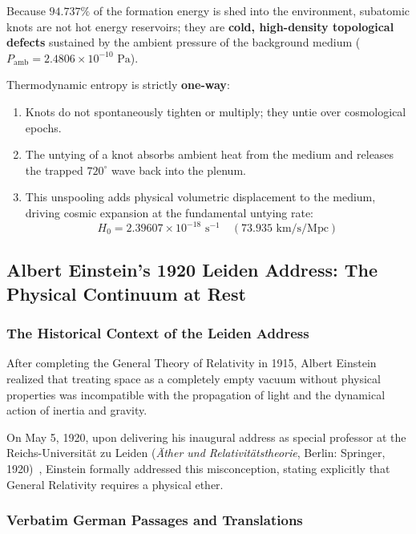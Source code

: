 \documentclass[11pt,a4paper]{article}
\begin{document}
Because $94.737\%$ of the formation energy is shed into the environment, subatomic knots are not hot energy reservoirs; they are \textbf{cold, high-density topological defects} sustained by the ambient pressure of the background medium ($P_{\text{amb}} = 2.4806 \times 10^{-10}\text{ Pa}$).

Thermodynamic entropy is strictly \textbf{one-way}:
\begin{enumerate}
    \item Knots do not spontaneously tighten or multiply; they untie over cosmological epochs.
    \item The untying of a knot absorbs ambient heat from the medium and releases the trapped $720^\circ$ wave back into the plenum.
    \item This unspooling adds physical volumetric displacement to the medium, driving cosmic expansion at the fundamental untying rate:
    \begin{equation}
    H_0 = 2.39607 \times 10^{-18}\text{ s}^{-1} \quad (73.935\text{ km/s/Mpc})
    \end{equation}
\end{enumerate}

\subsection{Albert Einstein's 1920 Leiden Address: The Physical Continuum at Rest}
\label{subsec:leiden_ether}

\subsubsection{The Historical Context of the Leiden Address}

After completing the General Theory of Relativity in 1915, Albert Einstein realized that treating space as a completely empty vacuum without physical properties was incompatible with the propagation of light and the dynamical action of inertia and gravity.

On May 5, 1920, upon delivering his inaugural address as special professor at the Reichs-Universität zu Leiden (\textit{Äther und Relativitätstheorie}, Berlin: Springer, 1920)~\cite{Einstein1920}, Einstein formally addressed this misconception, stating explicitly that General Relativity requires a physical ether.

\subsubsection{Verbatim German Passages and Translations}
\end{document}
